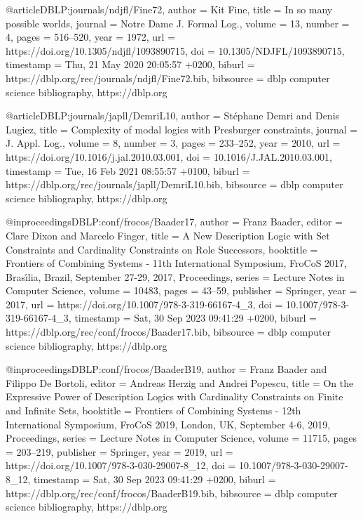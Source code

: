 
@article{DBLP:journals/ndjfl/Fine72,
  author       = {Kit Fine},
  title        = {In so many possible worlds},
  journal      = {Notre Dame J. Formal Log.},
  volume       = {13},
  number       = {4},
  pages        = {516--520},
  year         = {1972},
  url          = {https://doi.org/10.1305/ndjfl/1093890715},
  doi          = {10.1305/NDJFL/1093890715},
  timestamp    = {Thu, 21 May 2020 20:05:57 +0200},
  biburl       = {https://dblp.org/rec/journals/ndjfl/Fine72.bib},
  bibsource    = {dblp computer science bibliography, https://dblp.org}
}

@article{DBLP:journals/japll/DemriL10,
  author       = {St{\'{e}}phane Demri and
                  Denis Lugiez},
  title        = {Complexity of modal logics with Presburger constraints},
  journal      = {J. Appl. Log.},
  volume       = {8},
  number       = {3},
  pages        = {233--252},
  year         = {2010},
  url          = {https://doi.org/10.1016/j.jal.2010.03.001},
  doi          = {10.1016/J.JAL.2010.03.001},
  timestamp    = {Tue, 16 Feb 2021 08:55:57 +0100},
  biburl       = {https://dblp.org/rec/journals/japll/DemriL10.bib},
  bibsource    = {dblp computer science bibliography, https://dblp.org}
}


@inproceedings{DBLP:conf/frocos/Baader17,
  author       = {Franz Baader},
  editor       = {Clare Dixon and
                  Marcelo Finger},
  title        = {A New Description Logic with Set Constraints and Cardinality Constraints
                  on Role Successors},
  booktitle    = {Frontiers of Combining Systems - 11th International Symposium, FroCoS
                  2017, Bras{\'{\i}}lia, Brazil, September 27-29, 2017, Proceedings},
  series       = {Lecture Notes in Computer Science},
  volume       = {10483},
  pages        = {43--59},
  publisher    = {Springer},
  year         = {2017},
  url          = {https://doi.org/10.1007/978-3-319-66167-4\_3},
  doi          = {10.1007/978-3-319-66167-4\_3},
  timestamp    = {Sat, 30 Sep 2023 09:41:29 +0200},
  biburl       = {https://dblp.org/rec/conf/frocos/Baader17.bib},
  bibsource    = {dblp computer science bibliography, https://dblp.org}
}

@inproceedings{DBLP:conf/frocos/BaaderB19,
  author       = {Franz Baader and
                  Filippo De Bortoli},
  editor       = {Andreas Herzig and
                  Andrei Popescu},
  title        = {On the Expressive Power of Description Logics with Cardinality Constraints
                  on Finite and Infinite Sets},
  booktitle    = {Frontiers of Combining Systems - 12th International Symposium, FroCoS
                  2019, London, UK, September 4-6, 2019, Proceedings},
  series       = {Lecture Notes in Computer Science},
  volume       = {11715},
  pages        = {203--219},
  publisher    = {Springer},
  year         = {2019},
  url          = {https://doi.org/10.1007/978-3-030-29007-8\_12},
  doi          = {10.1007/978-3-030-29007-8\_12},
  timestamp    = {Sat, 30 Sep 2023 09:41:29 +0200},
  biburl       = {https://dblp.org/rec/conf/frocos/BaaderB19.bib},
  bibsource    = {dblp computer science bibliography, https://dblp.org}
}

